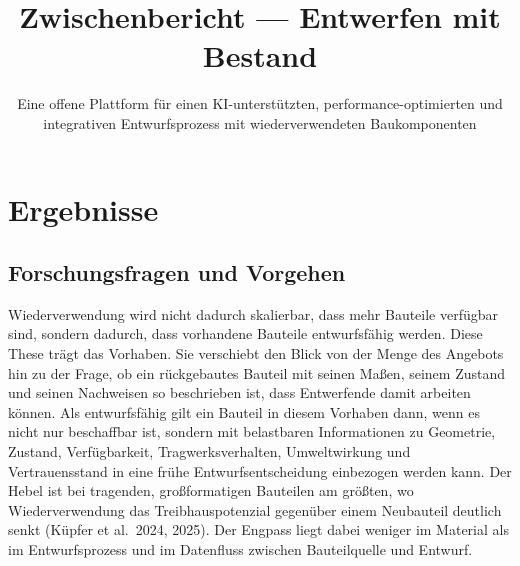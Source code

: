 \documentclass[type=zwischenbericht]{zukunftbau}
\title{Zwischenbericht --- Entwerfen mit Bestand}
\subtitle{Eine offene Plattform für einen KI-unterstützten, performance-optimierten und integrativen Entwurfsprozess mit wiederverwendeten Baukomponenten}
\begin{document}
\makecoverpages

\maketableofcontents


\section{Ergebnisse}

\subsection{Forschungsfragen und Vorgehen}

Wiederverwendung wird nicht dadurch skalierbar, dass mehr Bauteile verfügbar sind, sondern dadurch, dass vorhandene Bauteile entwurfsfähig werden. Diese These trägt das Vorhaben. Sie verschiebt den Blick von der Menge des Angebots hin zu der Frage, ob ein rückgebautes Bauteil mit seinen Maßen, seinem Zustand und seinen Nachweisen so beschrieben ist, dass Entwerfende damit arbeiten können. Als entwurfsfähig gilt ein Bauteil in diesem Vorhaben dann, wenn es nicht nur beschaffbar ist, sondern mit belastbaren Informationen zu Geometrie, Zustand, Verfügbarkeit, Tragwerksverhalten, Umweltwirkung und Vertrauensstand in eine frühe Entwurfsentscheidung einbezogen werden kann. Der Hebel ist bei tragenden, großformatigen Bauteilen am größten, wo Wiederverwendung das Treibhauspotenzial gegenüber einem Neubauteil deutlich senkt (Küpfer et al.\ 2024, 2025). Der Engpass liegt dabei weniger im Material als im Entwurfsprozess und im Datenfluss zwischen Bauteilquelle und Entwurf.
\end{document}
